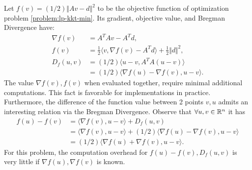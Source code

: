 \documentclass[12pt]{report}
\begin{document}
            Let $f(v) = (1/2)\Vert Av - d\Vert^2$ to be the objective function of optimization problem \eqref{problem:lp-kkt-min}. 
            Its gradient, objective value, and Bregman Divergence have: 
            \begin{align*}
                \nabla f(v) &= A^TAv - A^Td, 
                \\
                f(v) &= 
                \frac{1}{2}\langle v, \nabla f(v) - A^Td\rangle + \frac{1}{2}\Vert d\Vert^2, 
                \\
                D_f(u, v) &= (1/2)\langle u - v, A^TA (u - v)\rangle
                \\
                &= (1/2)\langle \nabla f(u) - \nabla f(v), u - v\rangle. 
            \end{align*}
            The value $\nabla f(v), f(v)$ when evaluated together, require minimal additional computations. 
            This fact is favorable for implementations in practice. 
            Furthermore, the difference of the function value between 2 points $v, u$ admits an interesting relation via the Bregman Divergence. 
            Observe that $\forall u, v \in \mathbb R^n$ it has 
            \begin{align*}
                f(u) - f(v) &= \langle \nabla f(v), u - v \rangle + D_f(u, v)
                \\
                &= \langle \nabla f(v), u - v \rangle + (1/2)\langle \nabla f(u) - \nabla f(v), u - v\rangle
                \\
                &= (1/2)\langle \nabla f(u) + \nabla f(v), u - v\rangle. 
            \end{align*}
            For this problem, the computation overhead for $f(u) - f(v), D_f(u, v)$ is very little if $\nabla f(u), \nabla f(v)$ is known. 
\end{document}
